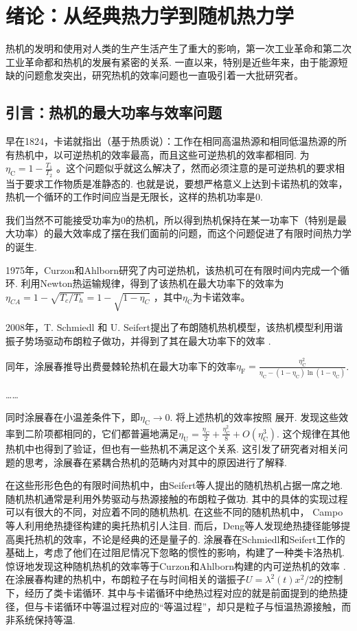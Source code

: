 \chapter{绪论：从经典热力学到随机热力学}
热机的发明和使用对人类的生产生活产生了重大的影响，第一次工业革命和第二次工业革命都和热机的发展有紧密的关系. 一直以来，特别是近些年来，由于能源短缺的问题愈发突出，研究热机的效率问题也一直吸引着一大批研究者。

\section{引言：热机的最大功率与效率问题}
\quad 早在1824，卡诺就指出（基于热质说）\cite{2005}：工作在相同高温热源和相同低温热源的所有热机中，以可逆热机的效率最高，而且这些可逆热机的效率都相同. 为$\eta _{\text{C}}=1-\frac{T_1}{T_2}$ 。这个问题似乎就这么解决了，然而必须注意的是可逆热机的要求相当于要求工作物质是准静态的. 也就是说，要想严格意义上达到卡诺热机的效率，热机一个循环的工作时间应当是无限长，这样的热机功率是0.

我们当然不可能接受功率为0的热机，所以得到热机保持在某一功率下（特别是最大功率）的最大效率成了摆在我们面前的问题，而这个问题促进了有限时间热力学的诞生. 

1975年，Curzon和Ahlborn研究了内可逆热机\cite{Curzon1975}，该热机可在有限时间内完成一个循环. 利用Newton热运输规律，得到了该热机在最大功率下的效率为$\eta _{CA}=1-\sqrt{T_c/T_h}=1-\sqrt{1-\eta _C}$ ，其中$\eta _\text{C}$为卡诺效率。

2008年，T. Schmiedl 和 U. Seifert提出了布朗随机热机模型\cite{Schmiedl2008}，该热机模型利用谐振子势场驱动布朗粒子做功，并得到了其在最大功率下的效率 . 

同年，涂展春推导出费曼棘轮热机\cite{Tu2008}在最大功率下的效率$\eta _{\text{F}}=\frac{\eta _{\text{C}}^{2}}{\eta _{\text{C}}-\left( 1-\eta _{\text{C}} \right) \ln \left( 1-\eta _{\text{C}} \right)}$. \cite{Tu2020}

……

同时涂展春\cite{Tu2008}在小温差条件下，即$\eta _{\text{C}}\rightarrow 0$. 将上述热机的效率按照 展开. 发现这些效率到二阶项都相同的，它们都普遍地满足$\eta _{\text{U}}=\frac{\eta _{\text{C}}}{2}+\frac{\eta _{\text{C}}^{2}}{8}+O\left( \eta _{\text{C}}^{3} \right)$. 这个规律在其他热机中也得到了验证，但也有一些热机不满足这个关系. 这引发了研究者对相关问题的思考，涂展春在紧耦合热机的范畴内对其中的原因进行了解释.\cite{Tu2020}

在这些形形色色的有限时间热机中，由Seifert等人提出的随机热机\cite{Schmiedl2008}占据一席之地. 随机热机通常是利用外势驱动与热源接触的布朗粒子做功. 其中的具体的实现过程可以有很大的不同，对应着不同的随机热机. 在这些不同的随机热机中， Campo等人利用绝热捷径构建的奥托热机\cite{DelCampo2014}引人注目. 而后，Deng等人发现绝热捷径能够提高奥托热机的效率，不论是经典的还是量子的.\cite{Deng2013} 涂展春在Schmiedl和Seifert工作\cite{Schmiedl2008}的基础上，考虑了他们在过阻尼情况下忽略的惯性的影响，构建了一种类卡洛热机\cite{Tu2013}. 惊讶地发现这种随机热机的效率等于Curzon和Ahlborn构建的内可逆热机\cite{Curzon1975}的效率 . 在涂展春构建的热机中\cite{Tu2013}，布朗粒子在与时间相关的谐振子$U=\lambda ^2\left( t \right) x^2/2$的控制下，经历了类卡诺循环. 其中与卡诺循环中绝热过程对应的就是前面提到的绝热捷径，但与卡诺循环中等温过程对应的“等温过程”，却只是粒子与恒温热源接触，而非系统保持等温. 

